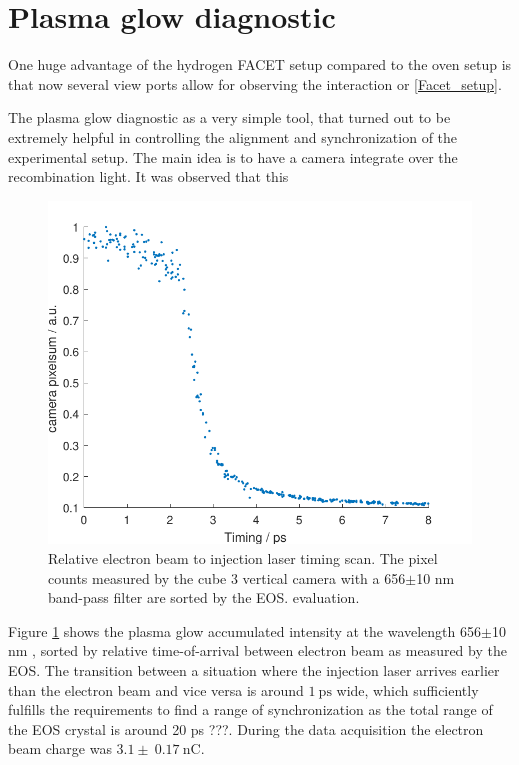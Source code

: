\section{Plasma glow diagnostic}
\label{sec:Plasma_Glow}
One huge advantage of the hydrogen FACET setup compared to the oven setup is that now several view ports allow for observing the interaction or \ref{Facet_setup}.

The plasma glow diagnostic as a very simple tool, that turned out to be extremely helpful in controlling the 
alignment and synchronization of the experimental setup. The main idea is to have a camera integrate over the recombination light. It was observed that this 

\begin{figure}[htbp]
\includegraphics[width=1\textwidth]{experiment/images/raw/PlasmaGlow_20384_scatter.pdf}
\caption{Relative electron beam to injection laser timing scan. The pixel counts measured by the cube 3 vertical camera with a 656$\pm$10 nm  band-pass filter are sorted by the EOS. evaluation.}
\label{img:PlasmaGlowTimingOAP_H2He}
\end{figure}

Figure \ref{img:PlasmaGlowTimingOAP_H2He} shows the plasma glow accumulated intensity at the wavelength 656$\pm$10 nm , sorted by relative time-of-arrival between electron beam as measured by the EOS. The transition between a situation where the injection laser arrives earlier than the electron beam and vice versa is around $1\ \mathrm{ps}$ wide, which sufficiently fulfills the requirements to find a range of synchronization as the total range of the EOS crystal is around 20 ps ???.
During the data acquisition the electron beam charge was $3.1\pm \ 0.17\ \mathrm{nC}$. 

